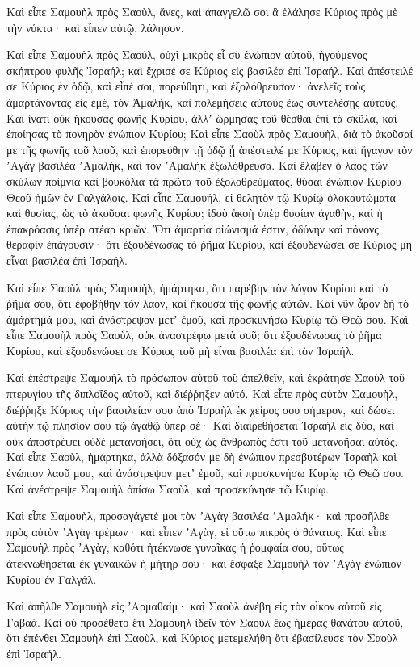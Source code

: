 {Καὶ εἶπε Σαμουὴλ πρὸς Σαοὺλ, ἄνες, καὶ ἀπαγγελῶ σοι ἃ ἐλάλησε Κύριος πρὸς μὲ τὴν νύκτα· καὶ εἶπεν αὐτῷ, λάλησον.
\par }{\PP {}Καὶ εἶπε Σαμουὴλ πρὸς Σαούλ, οὐχὶ μικρὸς εἶ σὺ ἐνώπιον αὐτοῦ, ἡγούμενος σκήπτρου φυλῆς Ἰσραήλ; καὶ ἔχρισέ σε Κύριος εἰς βασιλέα ἐπὶ Ἰσραήλ.
Καὶ ἀπέστειλέ σε Κύριος ἐν ὁδῷ, καὶ εἶπέ σοι, πορεύθητι, καὶ ἐξολόθρευσον· ἀνελεῖς τοὺς ἁμαρτάνοντας εἰς ἐμέ, τὸν Ἀμαλὴκ, καὶ πολεμήσεις αὐτοὺς ἕως συντελέσῃς αὐτούς.
Καὶ ἱνατί οὐκ ἤκουσας φωνῆς Κυρίου, ἀλλʼ ὥρμησας τοῦ θέσθαι ἐπὶ τὰ σκῦλα, καὶ ἐποίησας τὸ πονηρὸν ἐνώπιον Κυρίου;
Καὶ εἶπε Σαοὺλ πρὸς Σαμουὴλ, διὰ τὸ ἀκοῦσαί με τῆς φωνῆς τοῦ λαοῦ, καὶ ἐπορεύθην τῇ ὁδῷ ᾗ ἀπέστειλέ με Κύριος, καὶ ἤγαγον τὸν ʼΑγὰγ βασιλέα ʼΑμαλὴκ, καὶ τὸν ʼΑμαλὴκ ἐξωλόθρευσα.
Καὶ ἔλαβεν ὁ λαὸς τῶν σκύλων ποίμνια καὶ βουκόλια τὰ πρῶτα τοῦ ἐξολοθρεύματος, θύσαι ἐνώπιον Κυρίου Θεοῦ ἡμῶν ἐν Γαλγάλοις.
Καὶ εἶπε Σαμουήλ, εἰ θελητὸν τῷ Κυρίῳ ὁλοκαυτώματα καὶ θυσίας, ὡς τὸ ἀκοῦσαι φωνῆς Κυρίου; ἰδοὺ ἀκοὴ ὑπὲρ θυσίαν ἀγαθὴν, καὶ ἡ ἐπακρόασις ὑπὲρ στέαρ κριῶν.
Ὅτι ἁμαρτία οἰώνισμά ἐστιν, ὀδύνην καὶ πόνονς θεραφὶν ἐπάγουσιν· ὅτι ἐξουδένωσας τὸ ῥῆμα Κυρίου, καὶ ἐξουδενώσει σε Κύριος μὴ εἶναι βασιλέα ἐπὶ Ἰσραήλ.
\par }{\PP {}Καὶ εἶπε Σαοὺλ πρὸς Σαμουὴλ, ἡμάρτηκα, ὅτι παρέβην τὸν λόγον Κυρίου καὶ τὸ ῥῆμά σου, ὅτι ἐφοβήθην τὸν λαὸν, καὶ ἤκουσα τῆς φωνῆς αὐτῶν.
Καὶ νῦν ἆρον δὴ τὸ ἁμάρτημά μου, καὶ ἀνάστρεψον μετʼ ἐμοῦ, καὶ προσκυνήσω Κυρίῳ τῷ Θεῷ σου.
Καὶ εἶπε Σαμουὴλ πρὸς Σαοὺλ, οὐκ ἀναστρέφω μετὰ σοῦ; ὅτι ἐξουδένωσας τὸ ῥῆμα Κυρίου, καὶ ἐξουδενώσει σε Κύριος τοῦ μὴ εἶναι βασιλέα ἐπὶ τὸν Ἰσραήλ.
\par }{\PP {}Καὶ ἐπέστρεψε Σαμουὴλ τὸ πρόσωπον αὐτοῦ τοῦ ἀπελθεῖν, καὶ ἐκράτησε Σαοὺλ τοῦ πτερυγίου τῆς διπλοΐδος αὐτοῦ, καὶ διέῤῥηξεν αὐτό.
Καὶ εἶπε πρὸς αὐτὸν Σαμουὴλ, διέῤῥηξε Κύριος τὴν βασιλείαν σου ἀπὸ Ἰσραὴλ ἐκ χείρος σου σήμερον, καὶ δώσει αὐτὴν τῷ πλησίον σου τῷ ἀγαθῷ ὑπὲρ σέ·
Καὶ διαιρεθήσεται Ἰσραὴλ εἰς δύο, καὶ οὐκ ἀποστρέψει οὐδὲ μετανοήσει, ὅτι οὐχ ὡς ἄνθρωπός ἐστι τοῦ μετανοῆσαι αὐτός.
Καὶ εἶπε Σαοὺλ, ἡμάρτηκα, ἀλλὰ δόξασόν με δὴ ἐνώπιον πρεσβυτέρων Ἰσραὴλ καὶ ἐνώπιον λαοῦ μου, καὶ ἀνάστρεψον μετʼ ἐμοῦ, καὶ προσκυνήσω Κυρίῳ τῷ Θεῷ σου.
Καὶ ἀνέστρεψε Σαμουὴλ ὀπίσω Σαοὺλ, καὶ προσεκύνησε τῷ Κυρίῳ.
\par }{\PP {}Καὶ εἶπε Σαμουὴλ, προσαγάγετέ μοι τὸν ʼΑγὰγ βασιλέα ʼΑμαλήκ· καὶ προσῆλθε πρὸς αὐτὸν ʼΑγὰγ τρέμων· καὶ εἶπεν ʼΑγὰγ, εἰ οὕτω πικρὸς ὁ θάνατος.
Καὶ εἶπε Σαμουὴλ πρὸς ʼΑγὰγ, καθότι ἠτέκνωσε γυναῖκας ἡ ῥομφαία σου, οὕτως ἀτεκνωθήσεται ἐκ γυναικῶν ἡ μήτηρ σου· καὶ ἔσφαξε Σαμουὴλ τὸν ʼΑγὰγ ἐνώπιον Κυρίου ἐν Γαλγάλ.
\par }{\PP {}Καὶ ἀπῆλθε Σαμουὴλ εἰς ʼΑρμαθαίμ· καὶ Σαοὺλ ἀνέβη εἰς τὸν οἶκον αὐτοῦ εἰς Γαβαά.
Καὶ οὐ προσέθετο ἔτι Σαμουὴλ ἰδεῖν τὸν Σαοὺλ ἕως ἡμέρας θανάτου αὐτοῦ, ὅτι ἐπένθει Σαμουὴλ ἐπὶ Σαοὺλ, καὶ Κύριος μετεμελήθη ὅτι ἐβασίλευσε τὸν Σαοὺλ ἐπὶ Ἰσραήλ.

}
